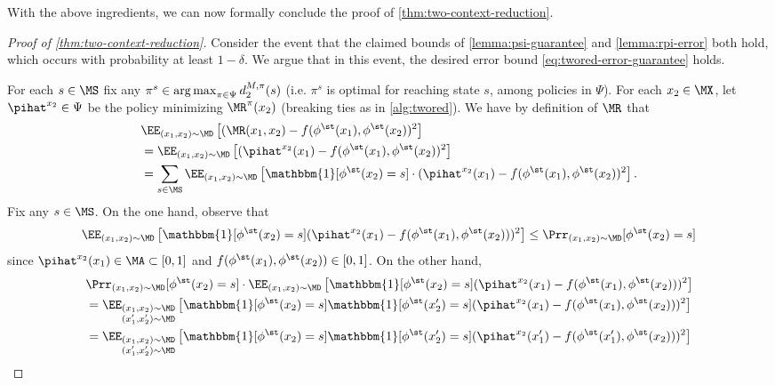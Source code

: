 With the above ingredients, we can now formally conclude the proof of \cref{thm:two-context-reduction}.

\vspace{1em}

\begin{proof}[Proof of \cref{thm:two-context-reduction}]
Consider the event that the claimed bounds of \cref{lemma:psi-guarantee} and \cref{lemma:rpi-error} both hold, which occurs with probability at least $1-\delta$. We argue that in this event, the desired error bound \eqref{eq:twored-error-guarantee} holds.

For each $s \in \MS$ fix any $\pi^s \in \operatorname*{arg\,max}_{\pi \in \Psi} d^{M,\pi}_2(s)$ (i.e. $\pi^s$ is optimal for reaching state $s$, among policies in $\Psi$). For each $x_2 \in \MX$, let $\pihat^{x_2} \in \Psi$ be the policy minimizing $\MR^\pi(x_2)$ (breaking ties as in \cref{alg:twored}). We have by definition of $\MR$ that
\begin{align*}
&\EE_{(x_1,x_2) \sim \MD} \left[(\MR(x_1,x_2) - f(\phi^\st(x_1),\phi^\st(x_2))^2 \right]\\
&= \EE_{(x_1,x_2) \sim \MD} \left[(\pihat^{x_2}(x_1) - f(\phi^\st(x_1),\phi^\st(x_2))^2 \right]\\
&= \sum_{s \in \MS} \EE_{(x_1,x_2) \sim \MD} \left[\mathbbm{1}[\phi^\st(x_2) = s] \cdot (\pihat^{x_2}(x_1) - f(\phi^\st(x_1),\phi^\st(x_2))^2\right].
\end{align*}
Fix any $s \in \MS$. On the one hand, observe that
\begin{equation}
\EE_{(x_1,x_2) \sim \MD} \left[\mathbbm{1}[\phi^\st(x_2) = s]  (\pihat^{x_2}(x_1) - f(\phi^\st(x_1),\phi^\st(x_2)))^2\right]
\leq \Prr_{(x_1,x_2) \sim \MD}[\phi^\st(x_2) = s]
\label{eq:err-bound-1}
\end{equation}
since $\pihat^{x_2}(x_1) \in \MA \subset [0,1]$ and $f(\phi^\st(x_1),\phi^\st(x_2)) \in [0,1]$. On the other hand,
\begin{align}
&\Prr_{(x_1,x_2) \sim \MD}[\phi^\st(x_2) = s] \cdot \EE_{(x_1,x_2) \sim \MD}\left[ \mathbbm{1}[\phi^\st(x_2) = s] (\pihat^{x_2}(x_1) - f(\phi^\st(x_1),\phi^\st(x_2)))^2\right] \nonumber\\ 
&= \EE_{\substack{(x_1,x_2) \sim \MD \\ (x_1',x_2') \sim \MD}}\left[ \mathbbm{1}[\phi^\st(x_2)=s]\mathbbm{1}[\phi^\st(x_2') = s]  (\pihat^{x_2}(x_1) - f(\phi^\st(x_1),\phi^\st(x_2)))^2 \right]\nonumber \\ 
&= \EE_{\substack{(x_1,x_2) \sim \MD \\ (x_1',x_2') \sim \MD}} \left[\mathbbm{1}[\phi^\st(x_2)=s]\mathbbm{1}[\phi^\st(x_2') = s]  (\pihat^{x_2}(x_1') - f(\phi^\st(x_1'),\phi^\st(x_2)))^2\right] \nonumber \\ 

\end{align}
\end{proof}
